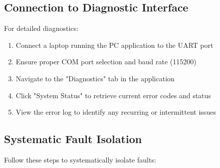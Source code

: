 \documentclass[12pt,a4paper,twoside,openright]{book}
\begin{document}
\subsection{Connection to Diagnostic Interface}

For detailed diagnostics:

\begin{enumerate}
    \item Connect a laptop running the PC application to the UART port
    \item Ensure proper COM port selection and baud rate (115200)
    \item Navigate to the "Diagnostics" tab in the application
    \item Click "System Status" to retrieve current error codes and status
    \item View the error log to identify any recurring or intermittent issues
\end{enumerate}

\subsection{Systematic Fault Isolation}

Follow these steps to systematically isolate faults:
\end{document}

